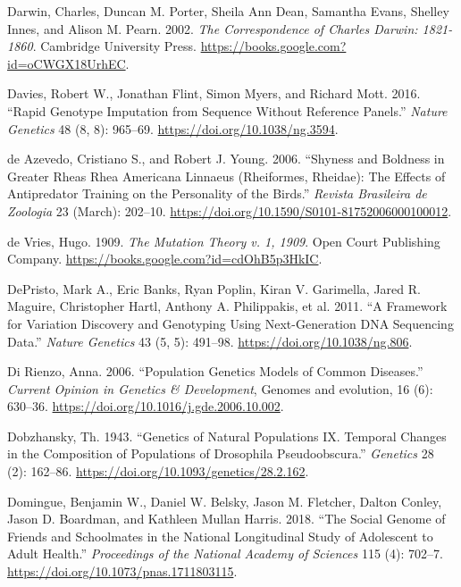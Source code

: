 \documentclass[
]{book}
\newlength{\cslhangindent}
\newlength{\cslentryspacingunit} %
\newenvironment{CSLReferences}[2] %
 {%
  \setlength{\parindent}{0pt}
  \ifodd #1
  \let\oldpar\par
  \def\par{\hangindent=\cslhangindent\oldpar}
  \fi
  \setlength{\parskip}{#2\cslentryspacingunit}
 }%
 {}
\begin{document}
\begin{CSLReferences}{1}{0}
\leavevmode{}%
Darwin, Charles, Duncan M. Porter, Sheila Ann Dean, Samantha Evans, Shelley Innes, and Alison M. Pearn. 2002. \emph{The {Correspondence} of {Charles Darwin}: 1821-1860}. {Cambridge University Press}. \url{https://books.google.com?id=oCWGX18UrhEC}.

\leavevmode{}%
Davies, Robert W., Jonathan Flint, Simon Myers, and Richard Mott. 2016. {``Rapid Genotype Imputation from Sequence Without Reference Panels.''} \emph{Nature Genetics} 48 (8, 8): 965--69. \url{https://doi.org/10.1038/ng.3594}.

\leavevmode{}%
de Azevedo, Cristiano S., and Robert J. Young. 2006. {``Shyness and Boldness in Greater Rheas {Rhea} Americana {Linnaeus} ({Rheiformes}, {Rheidae}): The Effects of Antipredator Training on the Personality of the Birds.''} \emph{Revista Brasileira de Zoologia} 23 (March): 202--10. \url{https://doi.org/10.1590/S0101-81752006000100012}.

\leavevmode{}%
de Vries, Hugo. 1909. \emph{The {Mutation} Theory v. 1, 1909}. {Open Court Publishing Company}. \url{https://books.google.com?id=cdOhB5p3HkIC}.

\leavevmode{}%
DePristo, Mark A., Eric Banks, Ryan Poplin, Kiran V. Garimella, Jared R. Maguire, Christopher Hartl, Anthony A. Philippakis, et al. 2011. {``A Framework for Variation Discovery and Genotyping Using Next-Generation {DNA} Sequencing Data.''} \emph{Nature Genetics} 43 (5, 5): 491--98. \url{https://doi.org/10.1038/ng.806}.

\leavevmode{}%
Di Rienzo, Anna. 2006. {``Population Genetics Models of Common Diseases.''} \emph{Current Opinion in Genetics \& Development}, Genomes and evolution, 16 (6): 630--36. \url{https://doi.org/10.1016/j.gde.2006.10.002}.

\leavevmode{}%
Dobzhansky, Th. 1943. {``Genetics of Natural Populations {IX}. {Temporal} Changes in the Composition of Populations of Drosophila Pseudoobscura.''} \emph{Genetics} 28 (2): 162--86. \url{https://doi.org/10.1093/genetics/28.2.162}.

\leavevmode{}%
Domingue, Benjamin W., Daniel W. Belsky, Jason M. Fletcher, Dalton Conley, Jason D. Boardman, and Kathleen Mullan Harris. 2018. {``The Social Genome of Friends and Schoolmates in the {National Longitudinal Study} of {Adolescent} to {Adult Health}.''} \emph{Proceedings of the National Academy of Sciences} 115 (4): 702--7. \url{https://doi.org/10.1073/pnas.1711803115}.


\end{CSLReferences}
\end{document}
